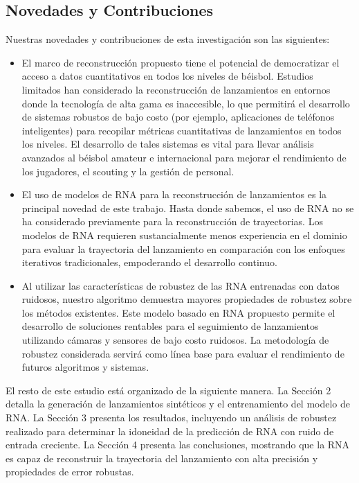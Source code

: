 \documentclass[12pt,a4paper]{article}
\begin{document}
\subsection{Novedades y Contribuciones}

Nuestras novedades y contribuciones de esta investigación son las siguientes:

\begin{itemize}
    \item El marco de reconstrucción propuesto tiene el potencial de democratizar el acceso a datos cuantitativos en todos los niveles de béisbol. Estudios limitados han considerado la reconstrucción de lanzamientos en entornos donde la tecnología de alta gama es inaccesible, lo que permitirá el desarrollo de sistemas robustos de bajo costo (por ejemplo, aplicaciones de teléfonos inteligentes) para recopilar métricas cuantitativas de lanzamientos en todos los niveles. El desarrollo de tales sistemas es vital para llevar análisis avanzados al béisbol amateur e internacional para mejorar el rendimiento de los jugadores, el scouting y la gestión de personal.
    
    \item El uso de modelos de RNA para la reconstrucción de lanzamientos es la principal novedad de este trabajo. Hasta donde sabemos, el uso de RNA no se ha considerado previamente para la reconstrucción de trayectorias. Los modelos de RNA requieren sustancialmente menos experiencia en el dominio para evaluar la trayectoria del lanzamiento en comparación con los enfoques iterativos tradicionales, empoderando el desarrollo continuo.
    
    \item Al utilizar las características de robustez de las RNA entrenadas con datos ruidosos, nuestro algoritmo demuestra mayores propiedades de robustez sobre los métodos existentes. Este modelo basado en RNA propuesto permite el desarrollo de soluciones rentables para el seguimiento de lanzamientos utilizando cámaras y sensores de bajo costo ruidosos. La metodología de robustez considerada servirá como línea base para evaluar el rendimiento de futuros algoritmos y sistemas.
\end{itemize}

El resto de este estudio está organizado de la siguiente manera. La Sección 2 detalla la generación de lanzamientos sintéticos y el entrenamiento del modelo de RNA. La Sección 3 presenta los resultados, incluyendo un análisis de robustez realizado para determinar la idoneidad de la predicción de RNA con ruido de entrada creciente. La Sección 4 presenta las conclusiones, mostrando que la RNA es capaz de reconstruir la trayectoria del lanzamiento con alta precisión y propiedades de error robustas.
\end{document}
